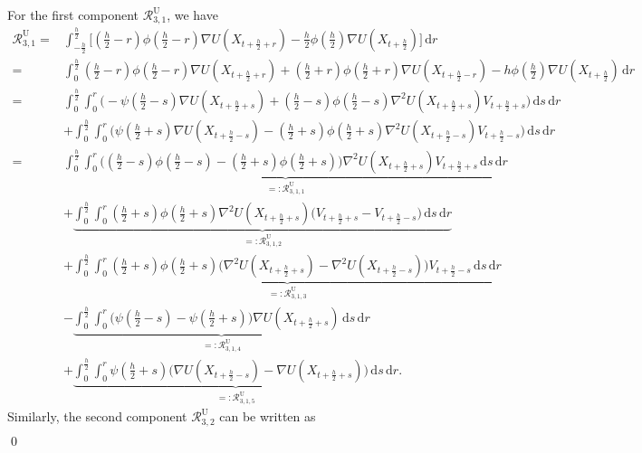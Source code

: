 \documentclass[12pt]{article}
\newenvironment{redtext}
  {\color{black}\ignorespaces}
  {\ignorespacesafterend}
\numberwithin{equation}{section}
\renewenvironment{proof}%
  {\begin{trivlist}%
   \item[]\ignorespaces}%
  {\qed\end{trivlist}}
\newcommand{\dd}{\mathrm{d}}
\begin{document}
\begin{redtext}
\begin{proof}
For the first component  \(\mathcal R^{\mathrm{U}}_{3,1}\), we have
\begin{align}
\mathcal R^{\mathrm{U}}_{3,1}
=&
\int^{\frac{h}{2}}_{-\frac{h}{2}}
\Big[
(\tfrac{h}{2}-r)\phi(\tfrac{h}{2}-r)
\nabla U(X_{t+\frac{h}{2}+r})
-
\tfrac{h}{2}\phi(\tfrac{h}{2})
\nabla U(X_{t+\frac{h}{2}})
\Big]
\,\dd r
\nonumber\\
=&
\int^{\frac{h}{2}}_{0}
(\tfrac{h}{2}-r)\phi(\tfrac{h}{2}-r)
\nabla U(X_{t+\frac{h}{2}+r})
+
(\tfrac{h}{2}+r)\phi(\tfrac{h}{2}+r)
\nabla U(X_{t+\frac{h}{2}-r})
-
h
\phi(\tfrac{h}{2})
\nabla U(X_{t+\frac{h}{2}})
\,\dd r
\nonumber \\
=&
\int^{\frac{h}{2}}_0
\int^{r}_0
\Big(
-\psi(\tfrac{h}{2}-s)\nabla U (X_{t+\frac{h}{2}+s})
+
(\tfrac{h}{2}-s)\phi(\tfrac{h}{2}-s)
\nabla^2 U(X_{t+\frac{h}{2}+s})V_{t+\frac{h}{2}+s}
\Big)
\, \dd s
\, \dd r
\nonumber \\
&+
\int^{\frac{h}{2}}_0
\int^{r}_0
\Big(
\psi(\tfrac{h}{2}+s)\nabla U (X_{t+\frac{h}{2}-s})
-
(\tfrac{h}{2}+s)\phi(\tfrac{h}{2}+s)
\nabla^2 U(X_{t+\frac{h}{2}-s})V_{t+\frac{h}{2}-s}
\Big)
\, \dd s
\, \dd r
\nonumber \\
={}&
\underbrace{
\int_0^{\frac h2}\int_0^r
\Big(
(\tfrac h2-s)\phi(\tfrac h2-s)
-
(\tfrac h2+s)\phi(\tfrac h2+s)
\Big)
\nabla^2U(X_{t+\frac h2+s})
V_{t+\frac h2+s}
\,\dd s\,\dd r
}_{=:\mathcal R^{\mathrm{U}}_{3,1,1}}
\nonumber\\
&+
\underbrace{
\int_0^{\frac h2}\int_0^r
(\tfrac h2+s)\phi(\tfrac h2+s)
\nabla^2U(X_{t+\frac h2+s})
\Big(
V_{t+\frac h2+s}
-
V_{t+\frac h2-s}
\Big)
\,\dd s\,\dd r
}_{=:\mathcal R^{\mathrm{U}}_{3,1,2}}
\nonumber\\
&+
\underbrace{
\int_0^{\frac h2}\int_0^r
(\tfrac h2+s)\phi(\tfrac h2+s)
\Big(
\nabla^2U(X_{t+\frac h2+s})
-
\nabla^2U(X_{t+\frac h2-s})
\Big)
V_{t+\frac h2-s}
\,\dd s\,\dd r
}_{=:\mathcal R^{\mathrm{U}}_{3,1,3}}
\nonumber\\
&-
\underbrace{
\int_0^{\frac h2}\int_0^r
\Big(
\psi(\tfrac h2-s)
-
\psi(\tfrac h2+s)
\Big)
\nabla U(X_{t+\frac h2+s})
\,\dd s\,\dd r
}_{=:\mathcal R^{\mathrm{U}}_{3,1,4}}
\nonumber\\
&+
\underbrace{
\int_0^{\frac h2}\int_0^r
\psi(\tfrac h2+s)
\Big(
\nabla U(X_{t+\frac h2-s})
-
\nabla U(X_{t+\frac h2+s})
\Big)
\,\dd s\,\dd r
}_{=:\mathcal R^{\mathrm{U}}_{3,1,5}}.
\label{eq:R3-first-component-decomposition}
\end{align}
Similarly, the second component $\mathcal R^{\mathrm{U}}_{3,2}$ can be written as
\begin{align}

\end{align}
\end{proof}
\end{redtext}
\end{document}
